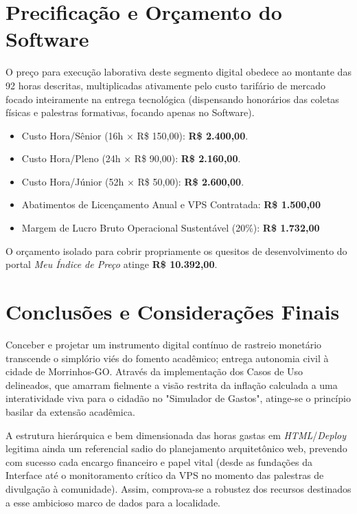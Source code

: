 \documentclass[12pt]{article}
\begin{document}
\section{Precificação e Orçamento do Software}
O preço para execução laborativa deste segmento digital obedece ao montante das 92 horas descritas, multiplicadas ativamente pelo custo tarifário de mercado focado inteiramente na entrega tecnológica (dispensando honorários das coletas físicas e palestras formativas, focando apenas no Software).

\begin{itemize}[leftmargin=*]
    \item Custo Hora/Sênior (16h $\times$ R\$ 150,00): \textbf{R\$ 2.400,00}.
    \item Custo Hora/Pleno (24h $\times$ R\$ 90,00): \textbf{R\$ 2.160,00}.
    \item Custo Hora/Júnior (52h $\times$ R\$ 50,00): \textbf{R\$ 2.600,00}.
    \item Abatimentos de Licençamento Anual e VPS Contratada: \textbf{R\$ 1.500,00}
    \item Margem de Lucro Bruto Operacional Sustentável (20\%): \textbf{R\$ 1.732,00}
\end{itemize}

O orçamento isolado para cobrir propriamente os quesitos de desenvolvimento do portal \textit{Meu Índice de Preço} atinge \textbf{R\$ 10.392,00}.

\section{Conclusões e Considerações Finais}
Conceber e projetar um instrumento digital contínuo de rastreio monetário transcende o simplório viés do fomento acadêmico; entrega autonomia civil à cidade de Morrinhos-GO. Através da implementação dos Casos de Uso delineados, que amarram fielmente a visão restrita da inflação calculada a uma interatividade viva para o cidadão no "Simulador de Gastos", atinge-se o princípio basilar da extensão acadêmica. 

A estrutura hierárquica e bem dimensionada das horas gastas em \textit{HTML}/\textit{Deploy} legitima ainda um referencial sadio do planejamento arquitetônico web, prevendo com sucesso cada encargo financeiro e papel vital (desde as fundações da Interface até o monitoramento crítico da VPS no momento das palestras de divulgação à comunidade). Assim, comprova-se a robustez dos recursos destinados a esse ambicioso marco de dados para a localidade.
\end{document}
